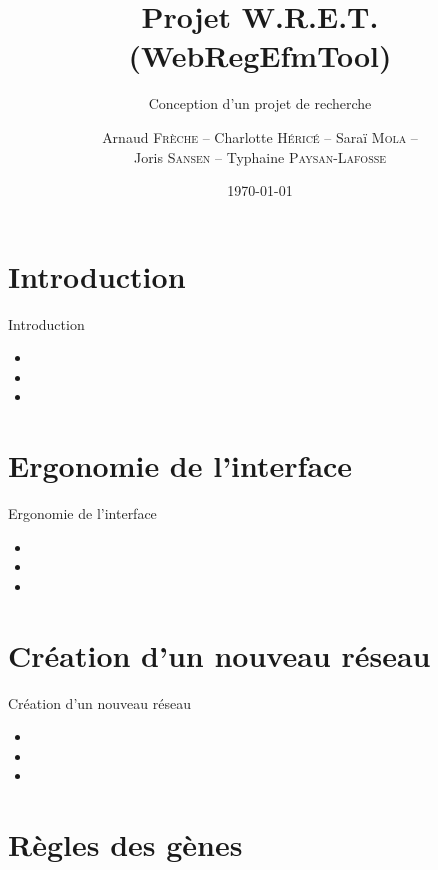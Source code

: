 \documentclass{beamer}
\title{\textcolor{bleu2}{\textbf{Projet W.R.E.T. (WebRegEfmTool)}}}
\subtitle{\textcolor{bleu1}{Conception d'un projet de recherche}}
\author[]{Arnaud \textsc{Frèche} -- Charlotte \textsc{Héricé} -- Saraï \textsc{Mola} -- \\ Joris \textsc{Sansen} -- Typhaine \textsc{Paysan-Lafosse}}
\institute{Master 2 BioInformatique}
\date{\today}
\begin{document}
\frame{\titlepage}
\frame{\tableofcontents}

\section{Introduction}

\begin{frame}{\textcolor{bleu2}{\hspace{1cm}Introduction}}
	\begin{itemize}
	\item 
	\item 
	\item 
	\end{itemize}
\end{frame}

\section{Ergonomie de l'interface}

\begin{frame}{\textcolor{bleu2}{\hspace{1cm} Ergonomie de l'interface}}
	\begin{itemize}
	\item 
	\item 
	\item 
	\end{itemize}
\end{frame}

\section{Création d'un nouveau réseau}

\begin{frame}{\textcolor{bleu2}{\hspace{1cm}Création d'un nouveau réseau}}
	\begin{itemize}
	\item 
	\item 
	\item 
	\end{itemize}
\end{frame}

\section{Règles des gènes}
\end{document}
